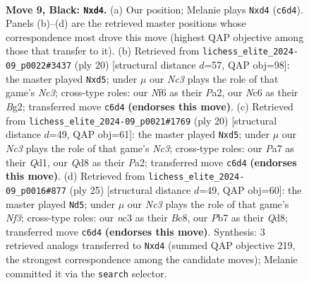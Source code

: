 \documentclass[11pt]{article}
\begin{document}
\clearpage

\begin{figure}[p]\centering
\begin{subfigure}{0.46\textwidth}\centering
\resizebox{\linewidth}{!}{%
\newchessgame
\chessboard[
  setfen={r1bq1rk1/ppp2pbp/2np1np1/8/2PNP3/2N4P/PP2BPP1/R1BQ1RK1 b - - 0 9},
  showmover=false,
  pgfstyle=straightmove, color=movearrow, markmove={c6-d4}
]}
\caption{}
\end{subfigure}\hfill
\begin{subfigure}{0.46\textwidth}\centering
\resizebox{\linewidth}{!}{%
\newchessgame
\chessboard[
  setfen={r1bq1rk1/pp2bpp1/2n1p3/3n3p/3N4/2N3PP/PP2PPB1/R1BQ1RK1 w - - 1 11},
  showmover=false,
  pgfstyle=straightmove, color=movearrow, markmove={c3-d5}
]}
\caption{}
\end{subfigure}
\\[4pt]
\begin{subfigure}{0.46\textwidth}\centering
\resizebox{\linewidth}{!}{%
\newchessgame
\chessboard[
  setfen={r1bq1rk1/p3bppp/1pn1p3/3n4/8/2NP1NP1/PP3PBP/R1BQ1RK1 w - - 0 11},
  showmover=false,
  pgfstyle=straightmove, color=movearrow, markmove={c3-d5}
]}
\caption{}
\end{subfigure}\hfill
\begin{subfigure}{0.46\textwidth}\centering
\resizebox{\linewidth}{!}{%
\newchessgame
\chessboard[
  setfen={r1bq1rk1/pp3pbp/2n2np1/8/1P1pN3/3P2P1/P3NPBP/1RBQ1RK1 b - - 1 13},
  showmover=false,
  pgfstyle=straightmove, color=movearrow, markmove={f6-d5}
]}
\caption{}
\end{subfigure}
\caption{\textbf{Move 9, Black: \texttt{Nxd4}.} (a) Our position; Melanie plays \texttt{Nxd4} (\texttt{c6d4}). Panels (b)--(d) are the retrieved master positions whose correspondence most drove this move (highest QAP objective among those that transfer to it). (b) Retrieved from \texttt{lichess\_elite\_2024-09\_p0022\#3437} (ply 20) [structural distance $d$=57, QAP obj=98]: the master played \texttt{Nxd5}; under $\mu$ our \emph{Nc3} plays the role of that game's \emph{Nc3}; cross-type roles: our \emph{N}f6 as their \emph{P}a2, our \emph{N}c6 as their \emph{B}g2; transferred move \texttt{c6d4} \textbf{(endorses this move)}. (c) Retrieved from \texttt{lichess\_elite\_2024-09\_p0021\#1769} (ply 20) [structural distance $d$=49, QAP obj=61]: the master played \texttt{Nxd5}; under $\mu$ our \emph{Nc3} plays the role of that game's \emph{Nc3}; cross-type roles: our \emph{P}a7 as their \emph{Q}d1, our \emph{Q}d8 as their \emph{P}a2; transferred move \texttt{c6d4} \textbf{(endorses this move)}. (d) Retrieved from \texttt{lichess\_elite\_2024-09\_p0016\#877} (ply 25) [structural distance $d$=49, QAP obj=60]: the master played \texttt{Nd5}; under $\mu$ our \emph{Nc3} plays the role of that game's \emph{Nf3}; cross-type roles: our \emph{n}c3 as their \emph{B}c8, our \emph{P}b7 as their \emph{Q}d8; transferred move \texttt{c6d4} \textbf{(endorses this move)}. Synthesis: 3 retrieved analogs transferred to \texttt{Nxd4} (summed QAP objective 219, the strongest correspondence among the candidate moves); Melanie committed it via the \texttt{search} selector.}
\label{fig:thought-m17}
\end{figure}
\end{document}
